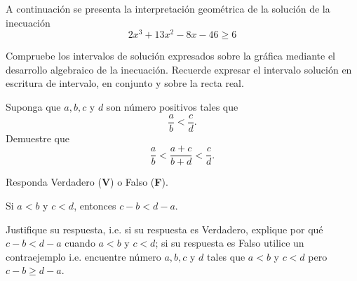 \documentclass[a4 paper]{article}
\begin{document}
\begin{paracol}{2}
 A continuación se presenta la interpretación geométrica de la solución de la inecuación
\[
  2x^3 + 13x^2 - 8x - 46 \geq 6
\]
\begin{figure}[ht]
    \centering
\end{figure}
\switchcolumn
Compruebe los intervalos de solución expresados sobre la gráfica mediante el desarrollo algebraico de la inecuación. Recuerde expresar el intervalo solución en escritura de intervalo, en conjunto y sobre la recta real.
\vskip 3mm
\solution{} 
\end{paracol}
\vskip 3mm

 Suponga que $a, b, c$ y $d$ son número positivos tales que
\[
  \frac{a}{b} < \frac{c}{d}.
\]
Demuestre que
\[
  \frac{a}{b} < \frac{a + c}{b + d} < \frac{c}{d}.
\]
\vskip 3mm
\solution{}
\vspace{30mm}

 Responda Verdadero (\textbf{V}) o Falso (\textbf{F}).
\begin{center}
    Si $a < b$ y $c < d$, entonces $c - b < d - a$.
\end{center}
Justifique su respuesta, i.e. si su respuesta es Verdadero, explique por qué $c - b < d - a$ cuando $a < b$ y $c < d$; si su respuesta es Falso utilice un contraejemplo i.e. encuentre número $a, b, c$ y $d$ tales que $a < b$ y $c < d$ pero $c - b \geq d - a$.
\vskip 3mm
\solution{}
\vspace{30mm}
\end{document}
